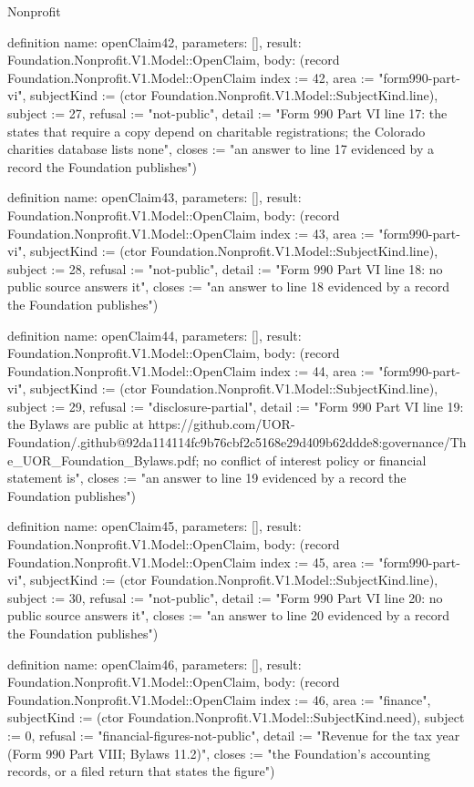 \begin{lexlean}{Nonprofit}
\begin{semanticmodule}
definition{
  name: openClaim42,
  parameters: [],
  result: Foundation.Nonprofit.V1.Model::OpenClaim,
  body: (record Foundation.Nonprofit.V1.Model::OpenClaim {index := 42, area := "form990-part-vi", subjectKind := (ctor Foundation.Nonprofit.V1.Model::SubjectKind.line), subject := 27, refusal := "not-public", detail := "Form 990 Part VI line 17: the states that require a copy depend on charitable registrations; the Colorado charities database lists none", closes := "an answer to line 17 evidenced by a record the Foundation publishes"})
}

definition{
  name: openClaim43,
  parameters: [],
  result: Foundation.Nonprofit.V1.Model::OpenClaim,
  body: (record Foundation.Nonprofit.V1.Model::OpenClaim {index := 43, area := "form990-part-vi", subjectKind := (ctor Foundation.Nonprofit.V1.Model::SubjectKind.line), subject := 28, refusal := "not-public", detail := "Form 990 Part VI line 18: no public source answers it", closes := "an answer to line 18 evidenced by a record the Foundation publishes"})
}

definition{
  name: openClaim44,
  parameters: [],
  result: Foundation.Nonprofit.V1.Model::OpenClaim,
  body: (record Foundation.Nonprofit.V1.Model::OpenClaim {index := 44, area := "form990-part-vi", subjectKind := (ctor Foundation.Nonprofit.V1.Model::SubjectKind.line), subject := 29, refusal := "disclosure-partial", detail := "Form 990 Part VI line 19: the Bylaws are public at https://github.com/UOR-Foundation/.github@92da114114fc9b76cbf2c5168e29d409b62ddde8:governance/The_UOR_Foundation_Bylaws.pdf; no conflict of interest policy or financial statement is", closes := "an answer to line 19 evidenced by a record the Foundation publishes"})
}

definition{
  name: openClaim45,
  parameters: [],
  result: Foundation.Nonprofit.V1.Model::OpenClaim,
  body: (record Foundation.Nonprofit.V1.Model::OpenClaim {index := 45, area := "form990-part-vi", subjectKind := (ctor Foundation.Nonprofit.V1.Model::SubjectKind.line), subject := 30, refusal := "not-public", detail := "Form 990 Part VI line 20: no public source answers it", closes := "an answer to line 20 evidenced by a record the Foundation publishes"})
}

definition{
  name: openClaim46,
  parameters: [],
  result: Foundation.Nonprofit.V1.Model::OpenClaim,
  body: (record Foundation.Nonprofit.V1.Model::OpenClaim {index := 46, area := "finance", subjectKind := (ctor Foundation.Nonprofit.V1.Model::SubjectKind.need), subject := 0, refusal := "financial-figures-not-public", detail := "Revenue for the tax year (Form 990 Part VIII; Bylaws 11.2)", closes := "the Foundation’s accounting records, or a filed return that states the figure"})
}


\end{semanticmodule}
\end{lexlean}
